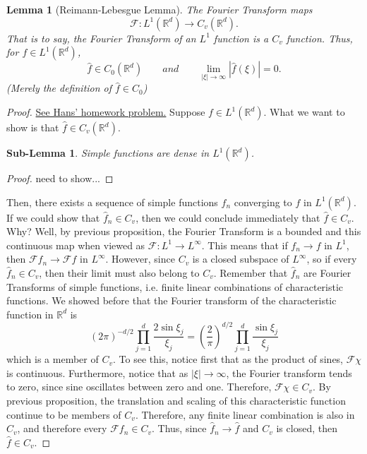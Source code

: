\documentclass[letterpaper,twoside,12pt]{article}
\theoremstyle{mystyle}
\newtheorem{lemma}[theorem]{Lemma}
\newtheorem{slem}{Sub-Lemma}
\newcommand{\R}{{\mathbb R}}
\newcommand{\cg}{\color{gray}}
\newcommand{\cbk}{\color{black}}
\newcommand{\cblu}{\color{blue}}
\begin{document}
\begin{lemma}[Reimann-Lebesgue Lemma]
  The Fourier Transform maps 
  \[\mathcal{F}:{L^1}\left( {{\mathbb{R}^d}} \right) \to {C_v}\left( {{\mathbb{R}^d}} \right).\]
  \cg That is to say, the Fourier Transform of an $L^1$ function is a $C_v$ function. \cbk Thus, for $f\in L^1\left( \R^d \right)$, 
  \[\hat f \in {C_0}\left( {{\mathbb{R}^d}} \right)\qquad and\qquad \mathop {\lim }\limits_{\left| \xi  \right| \to \infty } \left| {\hat f\left( \xi  \right)} \right| = 0.\] (Merely the definition of $\hat f \in C_0$)
\end{lemma}
\begin{proof}
  \href{https://web.ma.utexas.edu/users/koch/teaching/M383C-F22/access/M383C-F22-HW2-Solutions.pdf}{See Hans' homework problem.} 
  Suppose $f \in L^1\left( \R^d \right)$. What we want to show is that $\hat f \in C_v\left( \R^d \right)$. 

  \cblu
  \begin{slem} 
    Simple functions are dense in $L^1\left( \R^d \right)$. 
  \end{slem}
  \begin{proof}
    need to show...
  \end{proof}
  \cbk 
  Then, there exists a sequence of simple functions $f_n$ converging to $f$ in $L^1\left( \R^d \right)$.  If we could show that $\hat f_n \in C_v$, then we could conclude immediately that $\hat f \in C_v$. \cg Why? Well, by previous proposition, the Fourier Transform is a bounded and this continuous map when viewed as $\mathcal F : L^1 \to L^\infty$. This means that if $f_n \to f$ in $L^1$, then $\mathcal F f_n \to \mathcal F f$ in $L^\infty$. However, since $C_v$ is a closed subspace of $L^\infty$, so if every $\hat f_n \in C_v$, then their limit must also belong to $C_v$. \cbk
  Remember that $\hat f_n$ are Fourier Transforms of simple functions, i.e. finite linear combinations of characteristic functions. We showed before that the Fourier transform of the characteristic function in $\R^d$ is 
  \[{\left( {2\pi } \right)^{ - d/2}}\prod\limits_{j = 1}^d {\frac{{2\sin {\xi _j}}}{{{\xi _j}}}}  = {\left( {\frac{2}{\pi }} \right)^{d/2}}\prod\limits_{j = 1}^d {\frac{{\sin {\xi _j}}}{{{\xi _j}}}} \]
  which is a member of $C_v$. To see this, notice first that as the product of sines, $\mathcal F \chi$ is continuous. Furthermore, notice that as $|\xi|\to\infty$, the Fourier transform tends to zero, since sine oscillates between zero and one. Therefore, $\mathcal F \chi \in C_v$. By previous proposition, the translation and scaling of this characteristic function continue to be members of $C_v$. Therefore, any finite linear combination is also in $C_v$, and therefore every $\mathcal F f_n \in C_v$. Thus, since $\hat f_n \to \hat f$ and $C_v$ is closed, then $\hat f \in C_v$. 
  
\end{proof}
\end{document}

